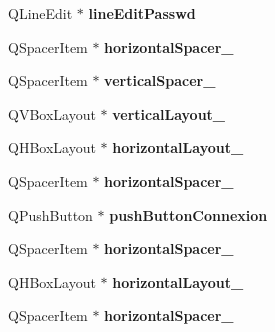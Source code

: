 \begin{DoxyCompactItemize}
\item 
\hypertarget{classUi__Dialog_a55903c75c6aaca163f58345785c80eaa}{Q\-Line\-Edit $\ast$ {\bfseries line\-Edit\-Passwd}}\label{classUi__Dialog_a55903c75c6aaca163f58345785c80eaa}

\item 
\hypertarget{classUi__Dialog_a82d8f43c1d5372aa9729796005e784b6}{Q\-Spacer\-Item $\ast$ {\bfseries horizontal\-Spacer\-\_}}\label{classUi__Dialog_a82d8f43c1d5372aa9729796005e784b6}

\item 
\hypertarget{classUi__Dialog_a74941704c736dfff50b9bef8eda12207}{Q\-Spacer\-Item $\ast$ {\bfseries vertical\-Spacer\-\_}}\label{classUi__Dialog_a74941704c736dfff50b9bef8eda12207}

\item 
\hypertarget{classUi__Dialog_acd165ec013acc890cb290ce16b9563f6}{Q\-V\-Box\-Layout $\ast$ {\bfseries vertical\-Layout\-\_}}\label{classUi__Dialog_acd165ec013acc890cb290ce16b9563f6}

\item 
\hypertarget{classUi__Dialog_ab23bf4588fc8ad303dc922ef54138d15}{Q\-H\-Box\-Layout $\ast$ {\bfseries horizontal\-Layout\-\_}}\label{classUi__Dialog_ab23bf4588fc8ad303dc922ef54138d15}

\item 
\hypertarget{classUi__Dialog_a054eeab37d5f8e9a4918d949a44428be}{Q\-Spacer\-Item $\ast$ {\bfseries horizontal\-Spacer\-\_}}\label{classUi__Dialog_a054eeab37d5f8e9a4918d949a44428be}

\item 
\hypertarget{classUi__Dialog_a2d5df2aa7fcc94b3305bb7e34de11253}{Q\-Push\-Button $\ast$ {\bfseries push\-Button\-Connexion}}\label{classUi__Dialog_a2d5df2aa7fcc94b3305bb7e34de11253}

\item 
\hypertarget{classUi__Dialog_af1c89e7936dfd7b410f670b80336b622}{Q\-Spacer\-Item $\ast$ {\bfseries horizontal\-Spacer\-\_}}\label{classUi__Dialog_af1c89e7936dfd7b410f670b80336b622}

\item 
\hypertarget{classUi__Dialog_ac3772f494bf164d526a04feff8314f96}{Q\-H\-Box\-Layout $\ast$ {\bfseries horizontal\-Layout\-\_}}\label{classUi__Dialog_ac3772f494bf164d526a04feff8314f96}

\item 
\hypertarget{classUi__Dialog_a23424803a38ec82be577f3d786a25ee0}{Q\-Spacer\-Item $\ast$ {\bfseries horizontal\-Spacer\-\_}}\label{classUi__Dialog_a23424803a38ec82be577f3d786a25ee0}


\end{DoxyCompactItemize}
